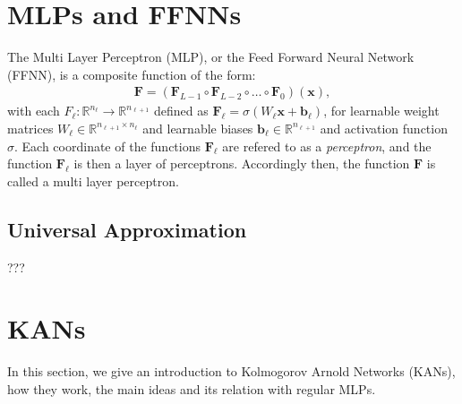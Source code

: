 \documentclass{article}
\title{\GetTitle}
\author{\Authors}
\date{\today}
\begin{document}
\maketitle

\section{MLPs and FFNNs}
The Multi Layer Perceptron (MLP), or the Feed Forward Neural Network (FFNN), is a composite function of the form: 
\begin{align}
    \mathbf{F} = \left(\mathbf{F}_{L-1} \circ \mathbf{F}_{L-2} \circ \dots \circ \mathbf{F}_{0}\right)(\mathbf{x}), \label{eq:MLP_def}
\end{align}
with each $F_{\ell} : \mathbb{R}^{n_{\ell}} \to \mathbb{R}^{n_{\ell + 1}}$ defined as $\mathbf{F}_{\ell} = \sigma\left( W_{\ell} \mathbf{x} + \mathbf{b}_{\ell} \right)$,
for learnable weight matrices $W_{\ell} \in \mathbb{R}^{n_{\ell + 1} \times n_{\ell}}$ and learnable biases $\mathbf{b}_{\ell} \in \mathbb{R}^{n_{\ell + 1}}$ and 
activation function $\sigma$. 
Each coordinate of the functions $\mathbf{F}_{\ell}$ are refered to as a \emph{perceptron}, and the function 
$\mathbf{F}_{\ell}$ is then a layer of perceptrons. Accordingly then, the function $\mathbf{F}$ is called a multi layer perceptron.



\subsection{Universal Approximation}
???



\section{KANs}
In this section, we give an introduction to Kolmogorov Arnold Networks (KANs), how they work, the main ideas and its relation with
regular MLPs.
\end{document}
